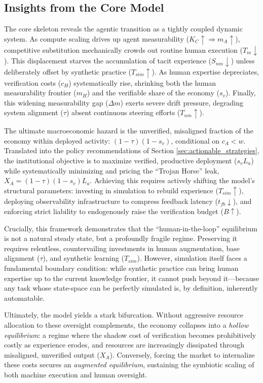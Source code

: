 \documentclass[12pt, letter]{article}
\begin{document}
\subsection{Insights from the Core Model}\label{subsec:core-summary}
The core skeleton reveals the agentic transition as a tightly coupled dynamic system. As compute scaling drives up agent measurability ($K_C\uparrow \Rightarrow m_A\uparrow$), competitive substitution mechanically crowds out routine human execution ($T_m\downarrow$). This displacement starves the accumulation of tacit experience ($S_{nm}\downarrow$) unless deliberately offset by synthetic practice ($T_{sim}\uparrow$). As human expertise depreciates, verification costs ($c_H$) systematically rise, shrinking both the human measurability frontier ($m_H$) and the verifiable share of the economy ($s_v$). Finally, this widening measurability gap ($\Delta m$) exerts severe drift pressure, degrading system alignment ($\tau$) absent continuous steering efforts ($T_{nm}\uparrow$).

The ultimate macroeconomic hazard is the unverified, misaligned fraction of the economy within deployed activity: $(1-\tau)(1-s_v)$, conditional on $c_A<w$. Translated into the policy recommendations of Section \ref{sec:actionable_strategies}, the institutional objective is to maximize verified, productive deployment ($s_v L_a$) while systematically minimizing and pricing the ``Trojan Horse'' leak, $X_A = (1-\tau)(1-s_v)L_a$. Achieving this requires actively shifting the model's structural parameters: investing in simulation to rebuild experience ($T_{sim}\uparrow$), deploying observability infrastructure to compress feedback latency ($t_{fb}\downarrow$), and enforcing strict liability to endogenously raise the verification budget ($B\uparrow$).

Crucially, this framework demonstrates that the ``human-in-the-loop'' equilibrium is not a natural steady state, but a profoundly fragile regime. Preserving it requires relentless, countervailing investments in human augmentation, base alignment ($\tau$), and synthetic learning ($T_{sim}$). However, simulation itself faces a fundamental boundary condition: while synthetic practice can bring human expertise up to the current knowledge frontier, it cannot push beyond it---because any task whose state-space can be perfectly simulated is, by definition, inherently automatable.

Ultimately, the model yields a stark bifurcation. Without aggressive resource allocation to these oversight complements, the economy collapses into a \emph{hollow equilibrium}: a regime where the shadow cost of verification becomes prohibitively costly as experience erodes, and resources are increasingly dissipated through misaligned, unverified output ($X_A$). Conversely, forcing the market to internalize these costs secures an \emph{augmented equilibrium}, sustaining the symbiotic scaling of both machine execution and human oversight.
\end{document}
